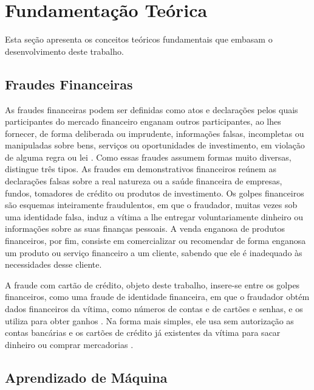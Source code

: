 \documentclass{uflamon}          %
\begin{document}

\chapter{Fundamentação Teórica}
\label{cap:fundamentacao}

Esta seção apresenta os conceitos teóricos fundamentais que embasam o desenvolvimento deste trabalho. 

\section{Fraudes Financeiras}
\label{sec:fraudes}

As fraudes financeiras podem ser definidas como atos e declarações pelos quais participantes do mercado financeiro enganam outros participantes, ao lhes fornecer, de forma deliberada ou imprudente, informações falsas, incompletas ou manipuladas sobre bens, serviços ou oportunidades de investimento, em violação de alguma regra ou lei \cite{reurink2016}. Como essas fraudes assumem formas muito diversas,  distingue três tipos. As fraudes em demonstrativos financeiros reúnem as declarações falsas sobre a real natureza ou a saúde financeira de empresas, fundos, tomadores de crédito ou produtos de investimento. Os golpes financeiros são esquemas inteiramente fraudulentos, em que o fraudador, muitas vezes sob uma identidade falsa, induz a vítima a lhe entregar voluntariamente dinheiro ou informações sobre as suas finanças pessoais. A venda enganosa de produtos financeiros, por fim, consiste em comercializar ou recomendar de forma enganosa um produto ou serviço financeiro a um cliente, sabendo que ele é inadequado às necessidades desse cliente.

A fraude com cartão de crédito, objeto deste trabalho, insere-se entre os golpes financeiros, como uma fraude de identidade financeira, em que o fraudador obtém dados financeiros da vítima, como números de contas e de cartões e senhas, e os utiliza para obter ganhos \cite{reurink2016}. Na forma mais simples, ele usa sem autorização as contas bancárias e os cartões de crédito já existentes da vítima para sacar dinheiro ou comprar mercadorias \cite{reurink2016}.

\section{Aprendizado de Máquina}
\label{sec:ml}
\end{document}
